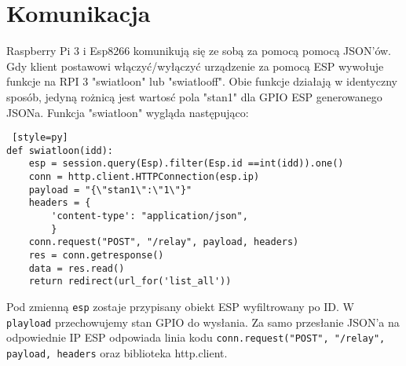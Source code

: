 \documentclass{xmgr}
\begin{document}
\section{Komunikacja}
Raspberry Pi 3 i Esp8266 komunikują się ze sobą za pomocą pomocą JSON'ów. Gdy klient postawowi włączyć/wyłączyć urządzenie za pomocą ESP wywołuje funkcje na RPI 3 "swiatloon" lub "swiatlooff". Obie funkcje działają w identyczny sposób,  jedyną rożnicą jest wartosć pola "stan1" dla GPIO ESP generowanego JSONa. Funkcja "swiatloon" wygląda następująco:
\begin{lstlisting} [style=py] 
def swiatloon(idd):
    esp = session.query(Esp).filter(Esp.id ==int(idd)).one()
    conn = http.client.HTTPConnection(esp.ip)
    payload = "{\"stan1\":\"1\"}"
    headers = {
        'content-type': "application/json",
        }
    conn.request("POST", "/relay", payload, headers)
    res = conn.getresponse()
    data = res.read()
    return redirect(url_for('list_all'))
\end{lstlisting}
Pod zmienną \texttt{esp} zostaje przypisany obiekt ESP wyfiltrowany po ID. W \texttt{playload} przechowujemy stan GPIO do wysłania. Za samo przesłanie JSON'a na odpowiednie IP ESP odpowiada linia kodu \texttt{conn.request("POST", "/relay", payload, headers} oraz biblioteka http.client. 
\end{document}
